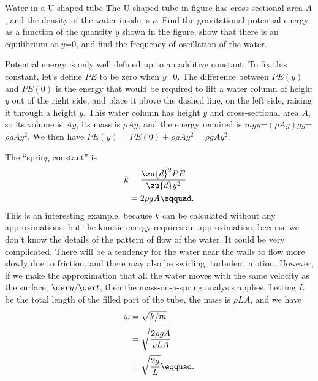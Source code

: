         \begin{eg}{Water in a U-shaped tube}\label{eg:utube}
        \egquestion
        The U-shaped tube in figure  has cross-sectional area
         $A$, and the density of the water inside
        is $\rho$. Find the gravitational potential energy as a function of the quantity $y$ shown in the
        figure, show that there is an equilibrium at $y$=0, and find
        the frequency of oscillation of the water.

        \eganswer
        Potential energy is only well defined
        up to an additive constant. To fix this constant, let's define $PE$ to be zero when $y$=0.
        The difference between $PE( y)$ and $PE(0)$ is the energy that would
        be required to lift a water column of height $y$ out of the right side, and place it
        above the dashed line, on the left side, raising it through a height $y$.
        This water column has height $y$ and
        cross-sectional area $A$, so its volume is $Ay$, its mass is $\rho Ay$, and
        the energy required is $mgy$=$(\rho Ay) gy$=$\rho gAy^2$.
        We then have $PE( y)= PE(0)+\rho gAy^2=\rho gAy^2$.

        The ``spring constant'' is
        \begin{align*}
                 k        &= \frac{\zu{d}^2 PE}{\zu{d} y^2} \\
                                &= 2\rho gA\eqquad.
        \end{align*}
        This is an interesting example, because $k$ can be calculated without any
        approximations, but the kinetic energy requires an approximation, because we
        don't know the details of the pattern of flow of the water. It could be very complicated.
        There will be a tendency for the water near the walls to flow more slowly due to
        friction, and there may also be swirling, turbulent motion. However, if we make
        the approximation that all the water moves with the same velocity as the surface,
        $\der y/\der t$, then the mass-on-a-spring analysis applies. Letting
        $L$ be the total length of the filled part of the tube, the mass is $\rho LA$, and
        we have
        \begin{align*}
                 \omega        &= \sqrt{ k/ m} \\
                               &= \sqrt{\frac{2\rho gA}{\rho LA}} \\
                               &= \sqrt{\frac{2g}{L}}\eqquad.
        \end{align*}
        \end{eg}

